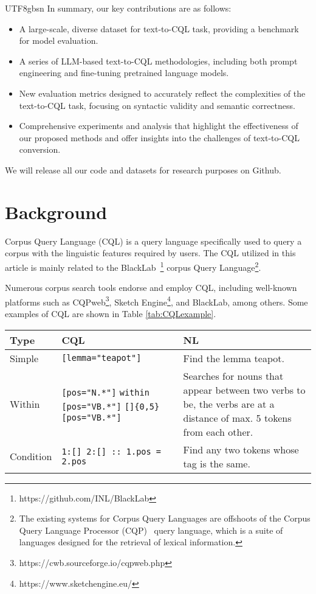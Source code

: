 \documentclass[11pt]{article}
\begin{document}
\begin{CJK*}{UTF8}{gbsn}
In summary, our key contributions are as follows:
\begin{itemize}
    \item A large-scale, diverse dataset for text-to-CQL task, providing a benchmark for model evaluation.
    \item A series of LLM-based text-to-CQL methodologies, including both prompt engineering and fine-tuning pretrained language models.
    \item New evaluation metrics designed to accurately reflect the complexities of the text-to-CQL task, focusing on syntactic validity and semantic correctness.
    \item Comprehensive experiments and analysis that highlight the effectiveness of our proposed methods and offer insights into the challenges of text-to-CQL conversion.
\end{itemize}

We will release all our code and datasets for research purposes on Github.


\section{Background}


 Corpus Query Language (CQL) is a query language specifically used to query a corpus with the linguistic features required by users. The CQL utilized in this article is mainly related to the BlackLab~\citep{blacklab}\footnote{https://github.com/INL/BlackLab} corpus Query Language\footnote{ The existing systems for Corpus Query Languages are offshoots of the Corpus Query Language Processor (CQP)~\citep{hardie2012cqpweb} query language, which is a suite of languages designed for the retrieval of lexical information. 
}. 
 
 Numerous corpus search tools endorse and employ CQL, including well-known platforms such as CQPweb\footnote{https://cwb.sourceforge.io/cqpweb.php}, Sketch Engine\footnote{https://www.sketchengine.eu/}, and BlackLab, among others. Some examples of CQL are shown in Table \ref{tab:CQLexample}.

\begin{table*}
    \centering
    \begin{tabular}{p{5em}p{15em}p{15em}} 
    \hline
    \textbf{Type} & \textbf{CQL} &\textbf{NL} \\
    \hline
    Simple & \verb|[lemma="teapot"]| &Find the lemma teapot.\\
    Within & \verb|[pos="N.*"]| \verb|within| \verb|[pos="VB.*"]| \verb|[]|\verb|{0,5} |\verb|[pos="VB.*"]| & Searches for nouns that appear between two verbs to be, the verbs are at a distance of max. 5 tokens from each other.\\
    Condition & \verb|1:[] 2:[] :: 1.pos = 2.pos| & Find any two tokens whose tag is the same.\\
    \hline
    \end{tabular}
    \caption{Example of the Corpus Query Language. The above examples and explanations are all from the Sketch Engine documentation.}
    \label{tab:CQLexample}
\end{table*}



\end{CJK*}
\end{document}
